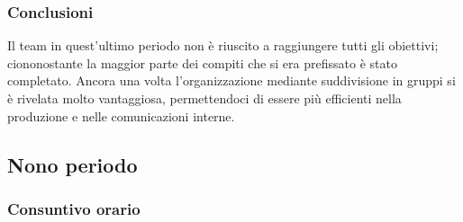 \subsubsection{Conclusioni}
Il team in quest'ultimo periodo non è riuscito a raggiungere tutti gli obiettivi; ciononostante la maggior parte dei compiti che si era prefissato è stato completato. Ancora una volta l'organizzazione mediante suddivisione in gruppi si è rivelata molto vantaggiosa, permettendoci di essere più efficienti nella produzione e nelle comunicazioni interne.

\subsection{Nono periodo}
\subsubsection{Consuntivo orario}
